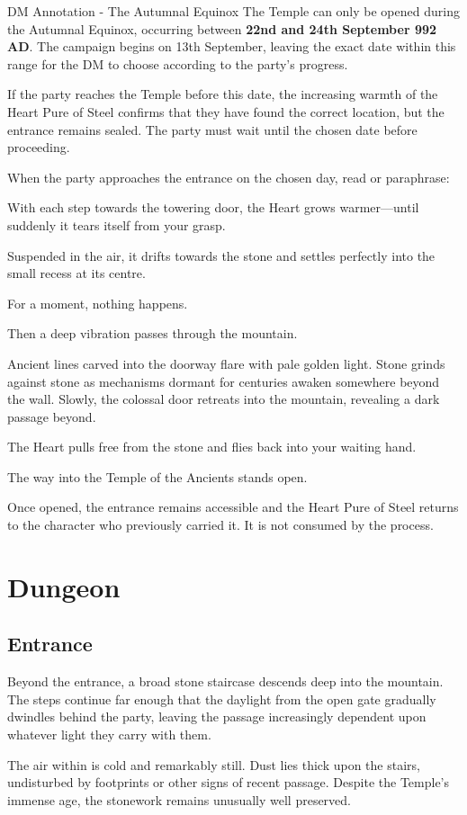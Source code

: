 \begingroup
	\DndSetThemeColor[PhbTan]
	\begin{DndComment}{DM Annotation - The Autumnal Equinox}
		The Temple can only be opened during the Autumnal Equinox, occurring between \textbf{22nd and 24th September 992 AD}. The campaign begins on 13th September, leaving the exact date within this range for the DM to choose according to the party's progress.

If the party reaches the Temple before this date, the increasing warmth of the Heart Pure of Steel confirms that they have found the correct location, but the entrance remains sealed. The party must wait until the chosen date before proceeding.
	\end{DndComment}
\endgroup

{\noindent\entryfont When the party approaches the entrance on the chosen day, read or paraphrase:}

\begin{DndReadAloud}
	With each step towards the towering door, the Heart grows warmer—until suddenly it tears itself from your grasp.

	Suspended in the air, it drifts towards the stone and settles perfectly into the small recess at its centre.

	For a moment, nothing happens.

	Then a deep vibration passes through the mountain.

	Ancient lines carved into the doorway flare with pale golden light. Stone grinds against stone as mechanisms dormant for centuries awaken somewhere beyond the wall. Slowly, the colossal door retreats into the mountain, revealing a dark passage beyond.

	The Heart pulls free from the stone and flies back into your waiting hand.

	The way into the Temple of the Ancients stands open.
\end{DndReadAloud}

{\noindent\entryfont Once opened, the entrance remains accessible and the Heart Pure of Steel returns to the character who previously carried it. It is not consumed by the process.}

\section*{Dungeon}\subsection*{ Entrance}
{\entryfont Beyond the entrance, a broad stone staircase descends deep into the mountain. The steps continue far enough that the daylight from the open gate gradually dwindles behind the party, leaving the passage increasingly dependent upon whatever light they carry with them.

The air within is cold and remarkably still. Dust lies thick upon the stairs, undisturbed by footprints or other signs of recent passage. Despite the Temple's immense age, the stonework remains unusually well preserved.}

